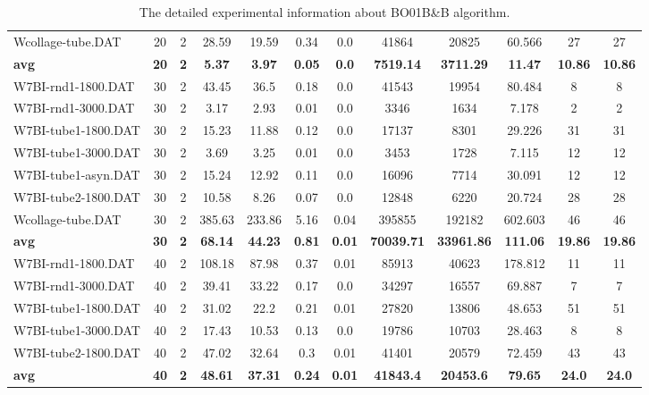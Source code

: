 \begin{table}[!h]
{\begin{tabular}{lccccccccccc}
Wcollage-tube.DAT & 20 & 2 & 28.59 & 19.59 & 0.34 & 0.0 & 41864 & 20825 & 60.566 & 27 & 27\\
\cline{1-12} \textbf{avg} & \textbf{20} & \textbf{2} & \textbf{5.37} & \textbf{3.97} & \textbf{0.05} & \textbf{0.0} & \textbf{7519.14} & \textbf{3711.29} & \textbf{11.47} & \textbf{10.86} & \textbf{10.86} \\ \cline{1-12}
W7BI-rnd1-1800.DAT & 30 & 2 & 43.45 & 36.5 & 0.18 & 0.0 & 41543 & 19954 & 80.484 & 8 & 8\\
W7BI-rnd1-3000.DAT & 30 & 2 & 3.17 & 2.93 & 0.01 & 0.0 & 3346 & 1634 & 7.178 & 2 & 2\\
W7BI-tube1-1800.DAT & 30 & 2 & 15.23 & 11.88 & 0.12 & 0.0 & 17137 & 8301 & 29.226 & 31 & 31\\
W7BI-tube1-3000.DAT & 30 & 2 & 3.69 & 3.25 & 0.01 & 0.0 & 3453 & 1728 & 7.115 & 12 & 12\\
W7BI-tube1-asyn.DAT & 30 & 2 & 15.24 & 12.92 & 0.11 & 0.0 & 16096 & 7714 & 30.091 & 12 & 12\\
W7BI-tube2-1800.DAT & 30 & 2 & 10.58 & 8.26 & 0.07 & 0.0 & 12848 & 6220 & 20.724 & 28 & 28\\
Wcollage-tube.DAT & 30 & 2 & 385.63 & 233.86 & 5.16 & 0.04 & 395855 & 192182 & 602.603 & 46 & 46\\
\cline{1-12} \textbf{avg} & \textbf{30} & \textbf{2} & \textbf{68.14} & \textbf{44.23} & \textbf{0.81} & \textbf{0.01} & \textbf{70039.71} & \textbf{33961.86} & \textbf{111.06} & \textbf{19.86} & \textbf{19.86} \\ \cline{1-12}
W7BI-rnd1-1800.DAT & 40 & 2 & 108.18 & 87.98 & 0.37 & 0.01 & 85913 & 40623 & 178.812 & 11 & 11\\
W7BI-rnd1-3000.DAT & 40 & 2 & 39.41 & 33.22 & 0.17 & 0.0 & 34297 & 16557 & 69.887 & 7 & 7\\
W7BI-tube1-1800.DAT & 40 & 2 & 31.02 & 22.2 & 0.21 & 0.01 & 27820 & 13806 & 48.653 & 51 & 51\\
W7BI-tube1-3000.DAT & 40 & 2 & 17.43 & 10.53 & 0.13 & 0.0 & 19786 & 10703 & 28.463 & 8 & 8\\
W7BI-tube2-1800.DAT & 40 & 2 & 47.02 & 32.64 & 0.3 & 0.01 & 41401 & 20579 & 72.459 & 43 & 43\\
\cline{1-12} \textbf{avg} & \textbf{40} & \textbf{2} & \textbf{48.61} & \textbf{37.31} & \textbf{0.24} & \textbf{0.01} & \textbf{41843.4} & \textbf{20453.6} & \textbf{79.65} & \textbf{24.0} & \textbf{24.0} \\ \cline{1-12}
\bottomrule
\end{tabular}%
}%
\caption{The detailed experimental information about BO01B\&B algorithm.}
\label{tab:table_bb}
\end{table}

